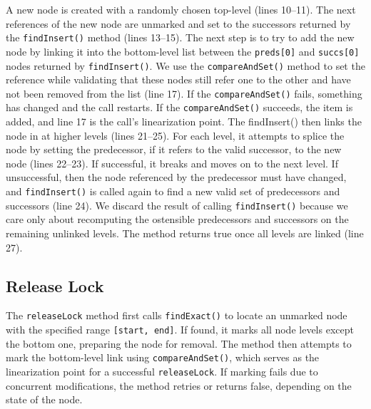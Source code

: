 A new node is created with a randomly chosen top-level (lines 10--11). 
The next references of the new node are unmarked and set to the successors returned by the \texttt{findInsert()} method (lines 13--15).
The next step is to try to add the new node by linking it into the bottom-level list between the \texttt{preds[0]} and \texttt{succs[0]} nodes returned by \texttt{findInsert()}. 
We use the \texttt{compareAndSet()} method to set the reference while validating that these nodes still refer one to the other and have not been removed from the list (line 17). 
If the  \texttt{compareAndSet()} fails, something has changed and the call restarts. 
If the  \texttt{compareAndSet()} succeeds, the item is added, and line 17 is the call's linearization point.
The {findInsert()} then links the node in at higher levels (lines 21--25). 
For each level, it attempts to splice the node by setting the predecessor, if it refers to the valid successor, to the new node (lines 22--23). If successful, it breaks and moves on to the next level. 
If unsuccessful, then the node referenced by the predecessor must have changed, and \texttt{findInsert()} is called again to find a new valid set of predecessors and successors (line 24). 
We discard the result of calling \texttt{findInsert()} because we care only about recomputing the ostensible predecessors and successors on the remaining unlinked levels. 
The method returns true once all levels are linked (line 27).

\subsection{Release Lock}\label{subsec:releaseLock}

The \texttt{releaseLock} method first calls \texttt{findExact()} to locate an unmarked node with the specified range \texttt{[start, end]}. 
If found, it marks all node levels except the bottom one, preparing the node for removal. 
The method then attempts to mark the bottom-level link using \texttt{compareAndSet()}, which serves as the linearization point for a successful \texttt{releaseLock}. 
If marking fails due to concurrent modifications, the method retries or returns false, depending on the state of the node.

\vspace{15pt}
\begin{figure}[h!]
    \centering
    
\end{figure}

